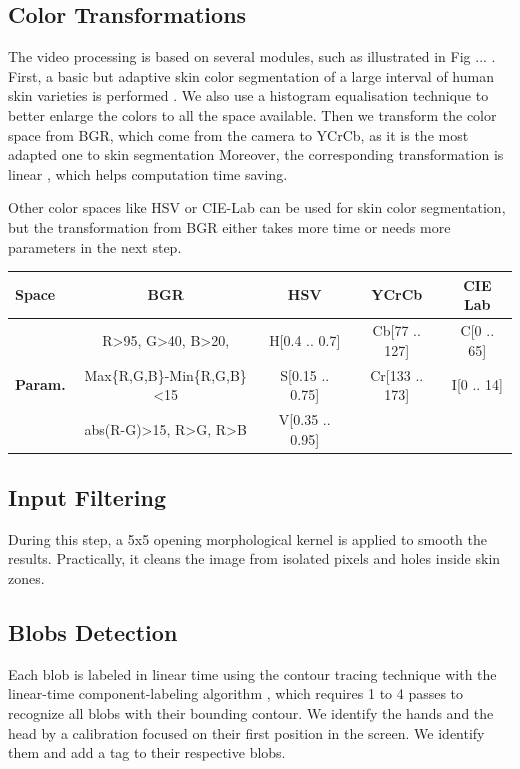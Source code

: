 \documentclass{llncs}
\begin{document}
\subsection{Color Transformations} %
The video processing is based on several modules, such as illustrated in Fig ... .
First, a basic but adaptive skin color segmentation of a large interval of human skin varieties is performed \cite{skinColorSeg}.
We also use a histogram equalisation technique to better enlarge the colors to all the space available.
Then we transform the color space from BGR, which come from the camera to YCrCb,
as it is the most adapted one to skin segmentation
Moreover, the corresponding transformation is linear \cite{skinColorSeg}, which helps computation time saving.

Other color spaces like HSV or CIE-Lab can be used for skin color segmentation,
but the transformation from BGR either takes more time or needs more parameters
in the next step.

\begin{center}
\begin{tabular}{|l|c|c|c|c|}
\hline
\textbf{Space} & BGR & HSV & YCrCb & CIE Lab\\
\hline
 & R\textgreater 95, G\textgreater 40, B\textgreater 20, & H[0.4 .. 0.7] & Cb[77 .. 127] & C[0 .. 65] \\
\textbf{Param.} & Max\{R,G,B\}-Min\{R,G,B\}\textless 15 & S[0.15 .. 0.75] & Cr[133 .. 173] & I[0 .. 14] \\
 & abs(R-G)\textgreater 15, R\textgreater G, R\textgreater B & V[0.35 .. 0.95] & & \\
\hline
\end{tabular}
\end{center}

\subsection{Input Filtering}
During this step, a 5x5 opening morphological kernel \cite{morphologicalAnalysis} is applied to smooth the results.
Practically, it cleans the image from isolated pixels and holes inside skin
zones.

\subsection{Blobs Detection}
Each blob is labeled in linear time using the contour tracing technique with
the linear-time component-labeling algorithm \cite{CompLabeling},
which requires 1 to 4 passes to recognize all blobs with their bounding contour.
We identify the hands and the head by a calibration focused on their first
position in the screen. We identify them and add a tag to their respective blobs.
\end{document}
